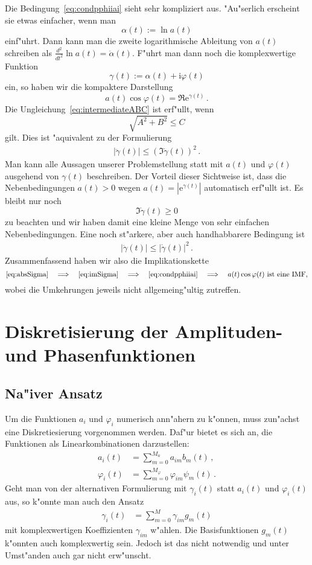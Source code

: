 \documentclass[a4paper]{scrartcl}
\newcommand{\ee}{{\mathrm{e}}}
\newcommand{\ii}{{\mathrm{i}}}
\newcommand{\pphi}{{\varphi}}
\begin{document}
Die Bedingung~\eqref{eq:condpphiiai} sieht sehr kompliziert aus. 
"Au"serlich erscheint sie etwas einfacher, wenn man
$$ \alpha(t):=\ln a(t) $$
einf"uhrt. Dann kann man die zweite logarithmische Ableitung von $a(t)$ schreiben als $\frac{d^2}{dt^2}\ln a(t) = \ddot\alpha(t)$. 
F"uhrt man dann noch die komplexwertige Funktion
$$ \gamma(t) := \alpha(t) + \ii\pphi(t) $$
ein, so haben wir die kompaktere Darstellung
$$ a(t)\cos\pphi(t) = \Re \ee^{\gamma(t)}\,. $$
Die Ungleichung~\eqref{eq:intermediateABC} ist erf"ullt, wenn 
$$ \sqrt{A^2 + B^2} \le C $$
gilt. Dies ist "aquivalent zu der Formulierung
\begin{align} \label{eq:imSigma}
  \lvert\ddot\gamma(t)\rvert \le \left(\Im\dot\gamma(t)\right)^2\,.
\end{align}
Man kann alle Aussagen unserer Problemstellung statt mit $a(t)$ und $\pphi(t)$ ausgehend von $\gamma(t)$ beschreiben. 
Der Vorteil dieser Sichtweise ist, dass die Nebenbedingungen $a(t)>0$ wegen $a(t)=|\ee^{\gamma(t)}|$ automatisch erf"ullt ist. 
Es bleibt nur noch 
$$ \Im\dot\gamma(t)\ge0 $$ 
zu beachten und wir haben damit eine kleine Menge von sehr einfachen Nebenbedingungen. 
Eine noch st"arkere, aber auch handhabbarere Bedingung ist 
  \begin{align} \label{eq:absSigma}
    \lvert\ddot\gamma(t)\rvert \le\lvert\dot\gamma(t)\rvert^2\,.
  \end{align}
Zusammenfassend haben wir also die Implikationskette 
$$ \text{\eqref{eq:absSigma}} \quad \Longrightarrow \quad
  \text{\eqref{eq:imSigma}} \quad \Longrightarrow \quad
  \text{\eqref{eq:condpphiiai}} \quad \Longrightarrow \quad
  \text{$a(t)\cos\pphi(t)$ ist eine IMF,} $$
wobei die Umkehrungen jeweils nicht allgemeing"ultig zutreffen. 


\section{Diskretisierung der Amplituden- und Phasenfunktionen} \label{sec:discretize}

\subsection{Na"iver Ansatz}

Um die Funktionen $a_i$ und $\pphi_i$ numerisch ann"ahern zu k"onnen, muss zun"achst eine Diskretiesierung vorgenommen werden. 
Daf"ur bietet es sich an, die Funktionen als Linearkombinationen darzustellen:
\begin{align*}
      a_i(t) &= \sum_{m=0}^{M_a    }     a_{im}    b_m(t)\,, \\ 
  \pphi_i(t) &= \sum_{m=0}^{M_\pphi} \pphi_{im} \psi_m(t)\,.
\end{align*}
Geht man von der alternativen Formulierung mit $\gamma_i(t)$ statt $a_i(t)$ und $\pphi_i(t)$ aus, so k"onnte man auch den Ansatz
\begin{align*}
  \gamma_i(t) &= \sum_{m=0}^M \gamma_{im}g_m(t)
\end{align*}
mit komplexwertigen Koeffizienten $\gamma_{im}$ w"ahlen. 
Die Basisfunktionen $g_m(t)$ k"onnten auch komplexwertig sein. 
Jedoch ist das nicht notwendig und unter Umst"anden auch gar nicht erw"unscht. 
\end{document}
